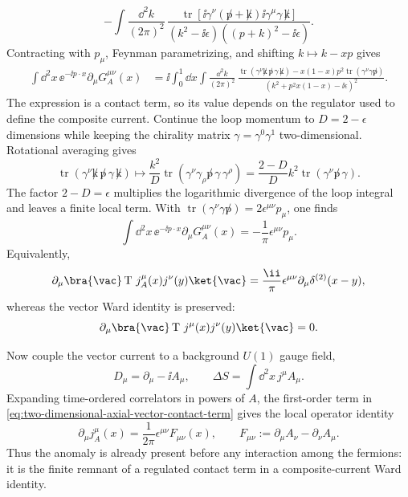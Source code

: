 \[
  -\int\frac{\dd^2k}{(2\pi)^2}\,
  \frac{
    \operatorname{tr}\!\left[
      \ii\gamma^\nu(\not p+\not k)
      \ii\gamma^\mu\gamma\,\not k
    \right]
  }{(k^2-\ii\epsilon)((p+k)^2-\ii\epsilon)} .
\]
Contracting with \(p_\mu\), Feynman parametrizing, and shifting
\(k\mapsto k-xp\) gives
\begin{align}
  \int\dd^2x\,\ee^{-\ii p\cdot x}
  \partial_\mu G_A^{\mu\nu}(x)
  &=
  \ii\int_0^1\dd x
  \int\frac{\dd^2k}{(2\pi)^2}\,
  \frac{
    \operatorname{tr}(\gamma^\nu\not k\,\not p\,\gamma\,\not k)
    -x(1-x)p^2
    \operatorname{tr}(\gamma^\nu\gamma\not p)
  }{(k^2+p^2x(1-x)-\ii\epsilon)^2}.
  \label{eq:two-dimensional-anomaly-shifted-integral}
\end{align}
The expression is a contact term, so its value depends on the regulator used
to define the composite current.  Continue the loop momentum to
\(D=2-\epsilon\) dimensions while keeping the chirality matrix
\(\gamma=\gamma^0\gamma^1\) two-dimensional.  Rotational averaging gives
\[
  \operatorname{tr}(\gamma^\nu\not k\,\not p\,\gamma\,\not k)
  \longmapsto
  \frac{k^2}{D}
  \operatorname{tr}(\gamma^\nu\gamma_\rho\not p\,\gamma\,\gamma^\rho)
  =
  \frac{2-D}{D}k^2
  \operatorname{tr}(\gamma^\nu\not p\,\gamma).
\]
The factor \(2-D=\epsilon\) multiplies the logarithmic divergence of the loop
integral and leaves a finite local term.  With
\(\operatorname{tr}(\gamma^\nu\gamma\not p)=2\epsilon^{\mu\nu}p_\mu\), one
finds
\[
  \int\dd^2x\,\ee^{-\ii p\cdot x}
  \partial_\mu G_A^{\mu\nu}(x)
  =
  -\frac1{\pi}\epsilon^{\mu\nu}p_\mu .
\]
Equivalently,
\begin{equation}
  \partial_\mu
  \bra{\vac}
  \operatorname T\,j_A^\mu(x)j^\nu(y)
  \ket{\vac}
  =
  \frac{\ii}{\pi}\epsilon^{\mu\nu}
  \partial_\mu\delta^{(2)}(x-y),
  \label{eq:two-dimensional-axial-vector-contact-term}
\end{equation}
whereas the vector Ward identity is preserved:
\[
  \partial_\mu
  \bra{\vac}
  \operatorname T\,j^\mu(x)j^\nu(y)
  \ket{\vac}
  =0 .
\]

Now couple the vector current to a background \(U(1)\) gauge field,
\[
  D_\mu=\partial_\mu-\ii A_\mu,
  \qquad
  \Delta S=\int\dd^2x\,j^\mu A_\mu .
\]
Expanding time-ordered correlators in powers of \(A\), the first-order term in
\eqref{eq:two-dimensional-axial-vector-contact-term} gives the local operator
identity
\begin{equation}
  \partial_\mu j_A^\mu(x)
  =
  \frac1{2\pi}\epsilon^{\mu\nu}F_{\mu\nu}(x),
  \qquad
  F_{\mu\nu}:=\partial_\mu A_\nu-\partial_\nu A_\mu .
  \label{eq:two-dimensional-axial-anomaly}
\end{equation}
Thus the anomaly is already present before any interaction among the fermions:
it is the finite remnant of a regulated contact term in a composite-current
Ward identity.

